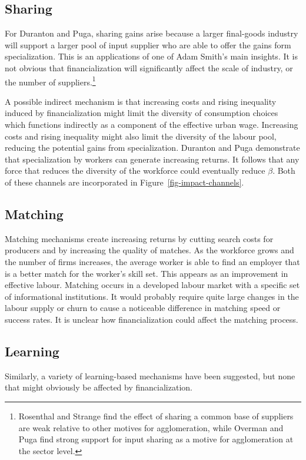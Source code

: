\subsection{Sharing}
For Duranton and Puga, sharing gains arise because a larger final-goods industry will support a larger pool of input supplier who are able to offer the gains form specialization. This is an applications of one of Adam Smith's main insights. It is not obvious that financialization will significantly affect the scale of industry, or the number of suppliers.\footnote{Rosenthal and Strange \cite{rosenthalEvidenceNatureSources2004} find the effect of sharing a common base of suppliers  are weak relative to other motives for agglomeration, while 
 Overman and Puga \cite{overmanLaborPoolingSource2010} find strong support for input sharing as a motive for agglomeration at the sector level.}

A possible indirect mechanism is that increasing costs and rising inequality induced by financialization might limit the diversity of consumption choices which functions indirectly as a component of the effective urban wage. Increasing costs and rising inequality might also limit the diversity of the labour pool, reducing the potential gains from specialization. Duranton and Puga  demonstrate that specialization by workers can generate increasing returns. It follows that any force that reduces the diversity of the workforce could eventually reduce $\beta$.  Both of these channels are incorporated in Figure~\ref{fig-impact-channels}.

\subsection{Matching}
Matching mechanisms create increasing returns by cutting search costs for producers and by increasing the quality of matches. As the workforce grows and the number of firms increases, the average worker is able to find an employer that is a better match for the worker's skill set. This appears as an improvement in effective labour. Matching occurs in a developed labour market with a specific set of informational institutions. It would probably require  quite large changes in the labour supply or churn to cause a noticeable difference in matching speed or success rates. It is unclear how financialization could affect the matching process.

\subsection{Learning}
Similarly, a variety of learning-based mechanisms have been suggested, but none that might obviously  be affected by financialization. 


